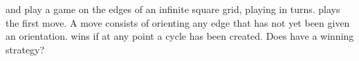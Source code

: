  and  play a game on the edges of an infinite square grid, playing in turns.  plays the first move. A move consists of orienting any edge that has not yet been given an orientation.  wins if at any point a cycle has been created. Does  have a winning strategy?
